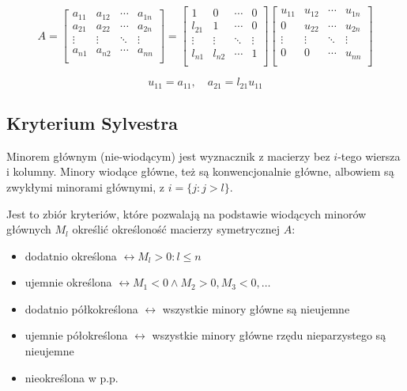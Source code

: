 \documentclass{../notatki}
\begin{document}
$$
A =
\begin{bmatrix}
  a_{11} & a_{12} & \cdots & a_{1n} \\
  a_{21} & a_{22} & \cdots & a_{2n} \\
  \vdots & \vdots & \ddots & \vdots \\
  a_{n1} & a_{n2} & \cdots & a_{nn} \\
\end{bmatrix}
=
\begin{bmatrix}
  1 & 0 & \cdots & 0 \\
  l_{21} & 1 & \cdots & 0 \\
  \vdots & \vdots & \ddots & \vdots \\
  l_{n1} & l_{n2} & \cdots & 1 \\
\end{bmatrix}
\begin{bmatrix}
  u_{11} & u_{12} & \cdots & u_{1n} \\
  0 & u_{22} & \cdots & u_{2n} \\
  \vdots & \vdots & \ddots & \vdots \\
  0 & 0 & \cdots & u_{nn} \\
\end{bmatrix}
$$

$$
u_{11} = a_{11}, \quad a_{21} = l_{21}u_{11}
$$

\subsection{Kryterium Sylvestra}

Minorem głównym (nie-wiodącym) jest wyznacznik z macierzy bez $i$-tego wiersza
i kolumny. Minory wiodące główne, też są konwencjonalnie główne, albowiem
są zwykłymi minorami głównymi, z $i = \{j : j > l\}$.

Jest to zbiór kryteriów, które pozwalają na podstawie wiodących minorów głównych
$M_l$ określić określoność macierzy symetrycznej $A$:
\begin{itemize}
  \item dodatnio określona $\leftrightarrow M_l > 0 : l \leq n$
  \item ujemnie określona $\leftrightarrow M_1 < 0 \land M_2 > 0, M_3
    < 0, \dots$
  \item dodatnio półkokreślona $\leftrightarrow$ wszystkie minory
    główne są nieujemne
  \item ujemnie półokreślona $\leftrightarrow$ wszystkie minory główne rzędu
    nieparzystego są nieujemne
  \item  nieokreślona w p.p.
\end{itemize}
\end{document}
